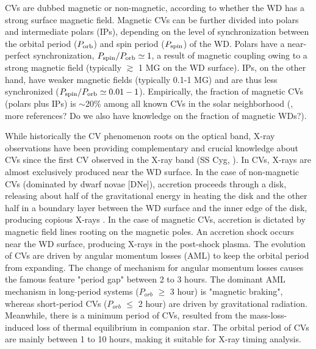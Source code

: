 \documentclass[fleqn,usenatbib]{mnras}
\begin{document}
CVs are dubbed magnetic or non-magnetic, according to whether the WD has a strong surface magnetic field. Magnetic CVs can be further divided into polars and intermediate polars (IPs), depending on the level of synchronization between the orbital period ($P_{\rm orb}$) and spin period ($P_{\rm spin}$) of the WD. Polars have a near-perfect synchronization, $P_{\rm spin}/P_{\rm orb}\simeq 1$, a result of magnetic coupling owing to a strong magnetic field (typically $\gtrsim$ 1 MG on the WD surface).
IPs, on the other hand, have weaker magnetic fields (typically 0.1-1 MG) and are thus less synchronized ($P_{\rm spin}/P_{\rm orb}\simeq 0.01-1$).
Empirically, the fraction of  magnetic CVs (polars plus IPs) is $\sim$20\% among all known CVs in the solar neighborhood (\citealt{2003A&A...404..301R}, more references? Do we also have knowledge on the fraction of magnetic WDs?).      

While historically the CV phenomenon roots on the optical band, X-ray observations have been providing complementary and crucial knowledge about CVs since the first CV observed in the X-ray band (SS Cyg, \citealp{1974ApJ...187L...5R,1978ApJ...224..953S}). 
In CVs, X-rays are almost exclusively produced near the WD surface. 
In the case of non-magnetic CVs (dominated by dwarf novae [DNe]), accretion proceeds through a disk, releasing about half of the gravitational energy in heating the disk and the other half in a boundary layer between the WD surface and the inner edge of the disk, producing copious X-rays \citep{2001cvs..book.....H}.    
In the case of magnetic CVs, accretion is dictated by magnetic field lines rooting on the magnetic poles. An accretion shock occurs near the WD surface, producing X-rays in the post-shock plasma. 
The evolution of CVs are driven by angular momentum losses (AML) to keep the orbital period from expanding. The change of mechanism for angular momentum losses causes the famous feature "period gap" between 2 to 3 hours.  The dominant AML mechanism in long-period systems ($P_{orb}$ $\geq$ 3 hour) is "magnetic braking", whereas short-period CVs ($P_{orb}$ $\leq$ 2 hour) are  driven by gravitational radiation. Meanwhile, there is a minimum period of CVs, resulted from the mass-loss-induced loss of thermal equilibrium in companion star. The orbital period of CVs are mainly between 1 to 10 hours, making it suitable for X-ray timing analysis.
\end{document}
